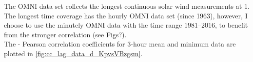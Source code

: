 The OMNI data set collects the longest continuous solar wind measurements at \SI{1}{\au}. The longest time coverage has the hourly OMNI data set (since 1963), however, I choose to use the minutely OMNI data with the time range 1981--2016, to benefit from the stronger correlation (see Figs?).\\

The \Kp{}-\vBz{} Pearson correlation coefficients for 3-hour mean and minimum data are plotted in \autoref{fig:cc_lag_data_d_KpvsVBzgsm}.
\begin{figure}[htb]
	\begin{floatrow}
\end{floatrow}
\end{figure}
